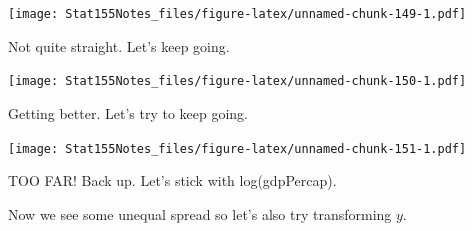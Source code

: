 \documentclass[]{book}
\newenvironment{Shaded}{\begin{snugshade}}{\end{snugshade}}
\newcommand{\CommentTok}[1]{\textcolor[rgb]{0.56,0.35,0.01}{\textit{#1}}}
\newcommand{\DataTypeTok}[1]{\textcolor[rgb]{0.13,0.29,0.53}{#1}}
\newcommand{\DecValTok}[1]{\textcolor[rgb]{0.00,0.00,0.81}{#1}}
\newcommand{\KeywordTok}[1]{\textcolor[rgb]{0.13,0.29,0.53}{\textbf{#1}}}
\newcommand{\NormalTok}[1]{#1}
\newcommand{\OperatorTok}[1]{\textcolor[rgb]{0.81,0.36,0.00}{\textbf{#1}}}
\newcommand{\StringTok}[1]{\textcolor[rgb]{0.31,0.60,0.02}{#1}}
\begin{document}
\texttt{[image: Stat155Notes\_files/figure-latex/unnamed-chunk-149-1.pdf]}

Not quite straight. Let's keep going.

\begin{Shaded}
\end{Shaded}

\texttt{[image: Stat155Notes\_files/figure-latex/unnamed-chunk-150-1.pdf]}

Getting better. Let's try to keep going.

\begin{Shaded}
\end{Shaded}

\texttt{[image: Stat155Notes\_files/figure-latex/unnamed-chunk-151-1.pdf]}

TOO FAR! Back up. Let's stick with log(gdpPercap).

Now we see some unequal spread so let's also try transforming \(y\).
\end{document}

